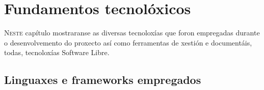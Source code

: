 \chapter{Fundamentos tecnolóxicos}
\minitoc


  \lettrine{N}{este} capítulo mostraranse as diversas tecnoloxías que foron empregadas 
durante o desenvolvemento do proxecto así como ferramentas de xestión e documentáis, 
todas, tecnoloxías Software Libre.

  \section{Linguaxes e frameworks empregados}
  

